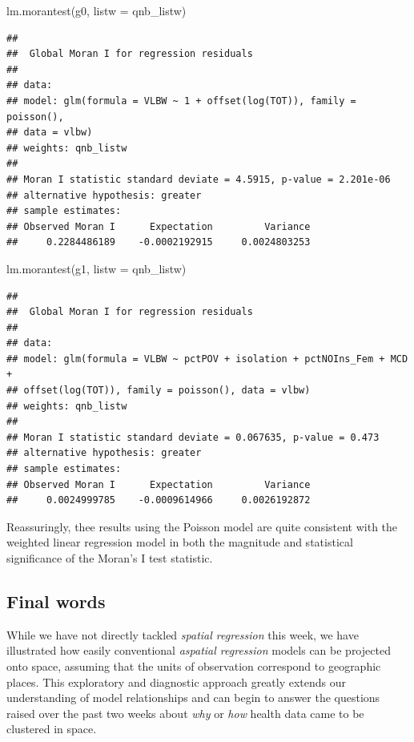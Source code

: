 \documentclass[
]{book}
\newenvironment{Shaded}{\begin{snugshade}}{\end{snugshade}}
\newcommand{\AttributeTok}[1]{\textcolor[rgb]{0.77,0.63,0.00}{#1}}
\newcommand{\FunctionTok}[1]{\textcolor[rgb]{0.00,0.00,0.00}{#1}}
\newcommand{\NormalTok}[1]{#1}
\begin{document}
\begin{Shaded}
\begin{Highlighting}[]
\FunctionTok{lm.morantest}\NormalTok{(g0, }\AttributeTok{listw =}\NormalTok{ qnb\_listw)}
\end{Highlighting}
\end{Shaded}

\begin{verbatim}
## 
##  Global Moran I for regression residuals
## 
## data:  
## model: glm(formula = VLBW ~ 1 + offset(log(TOT)), family = poisson(),
## data = vlbw)
## weights: qnb_listw
## 
## Moran I statistic standard deviate = 4.5915, p-value = 2.201e-06
## alternative hypothesis: greater
## sample estimates:
## Observed Moran I      Expectation         Variance 
##     0.2284486189    -0.0002192915     0.0024803253
\end{verbatim}

\begin{Shaded}
\begin{Highlighting}[]
\FunctionTok{lm.morantest}\NormalTok{(g1, }\AttributeTok{listw =}\NormalTok{ qnb\_listw)}
\end{Highlighting}
\end{Shaded}

\begin{verbatim}
## 
##  Global Moran I for regression residuals
## 
## data:  
## model: glm(formula = VLBW ~ pctPOV + isolation + pctNOIns_Fem + MCD +
## offset(log(TOT)), family = poisson(), data = vlbw)
## weights: qnb_listw
## 
## Moran I statistic standard deviate = 0.067635, p-value = 0.473
## alternative hypothesis: greater
## sample estimates:
## Observed Moran I      Expectation         Variance 
##     0.0024999785    -0.0009614966     0.0026192872
\end{verbatim}

Reassuringly, thee results using the Poisson model are quite consistent with the weighted linear regression model in both the magnitude and statistical significance of the Moran's I test statistic.

\hypertarget{final-words}{%
\subsection{Final words}\label{final-words}}

While we have not directly tackled \emph{spatial regression} this week, we have illustrated how easily conventional \emph{aspatial regression} models can be projected onto space, assuming that the units of observation correspond to geographic places. This exploratory and diagnostic approach greatly extends our understanding of model relationships and can begin to answer the questions raised over the past two weeks about \emph{why} or \emph{how} health data came to be clustered in space.
\end{document}
